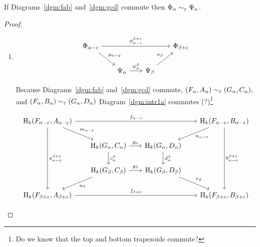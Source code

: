 \begin{lemma}
  If Diagrams~\ref{dgm:fab} and~\ref{dgm:gcd} commute then $\Phi_\alpha\sim_\varepsilon \Psi_\alpha$.
\end{lemma}
\begin{proof}

  \begin{enumerate}[label=\Roman*.]
    \item \begin{equation}\label{dgm:intr1}\begin{tikzcd}[column sep=scriptsize]
      \Phi_{\alpha-\e}  \arrow[to=Fb, "\phi_{\alpha-\e}^{\beta+\e}"]
                        \arrow[to=Ga, "\mu_{\alpha-\e}"]
      & & & |[alias=Fb]|
        \Phi_{\beta+\e} \\
      & |[alias=Ga]|
      \Psi_\alpha \arrow[to=Gb, "\psi_\alpha^\beta"]
      & |[alias=Gb]|
        \Psi_\beta \arrow[to=Fb, "\nu_\beta"] &
    \end{tikzcd}\end{equation}

    Because Diagrams~\ref{dgm:fab} and~\ref{dgm:gcd} commute, $(F_\alpha, A_\alpha)\sim_\varepsilon (G_\alpha, C_\alpha),$ and $(F_\alpha, B_\alpha)\sim_\varepsilon (G_\alpha, D_\alpha)$ Diagram~\ref{dgm:intr1a} commutes (?)\footnote{Do we know that the top and bottom trapezoids commute?}

    \begin{equation}\label{dgm:intr1a}\begin{tikzcd}[column sep=scriptsize]
      \hom_k(F_{\alpha-\e}, A_{\alpha-\e})  \arrow[to=Ba, "f_{\alpha-\e}"]
                                            \arrow[to=Ca, "m_{\alpha-\e}"]
                                            \arrow[to=Ab, "a_{\alpha-\e}^{\beta +\e}"]
      & & & |[alias=Ba]|
        \hom_k(F_{\alpha - \e}, B_{\alpha-\e})  \arrow[to=Da, "n_{\alpha -\e}"]
                                                \arrow[to=Bb, "b_{\alpha-\e}^{\beta+\e}"] \\
      & |[alias=Ca]|
      \hom_k(G_\alpha, C_\alpha)  \arrow[to=Da, "g_\alpha"]
                                  \arrow[to=Cb, "c_\alpha^\beta"]
      & |[alias=Da]|
        \hom_k(G_\alpha, D_\alpha)  \arrow[to=Db, "d_\alpha^\beta"] & \\
      & |[alias=Cb]|
      \hom_k(G_\beta, C_\beta)  \arrow[to=Ab, "u_\beta"]
                                \arrow[to=Db, "g_\beta"]
      & |[alias=Db]|
        \hom_k(G_\beta, D_\beta)  \arrow[to=Bb, "v_\beta"] & \\
      |[alias=Ab]|
      \hom_k(F_{\beta +\e}, A_{\beta + \e}) \arrow[to=Bb, "f_{\beta+\e}"]
      & & & |[alias=Bb]|
        \hom_k(F_{\beta+\e}, B_{\beta + \e})
    \end{tikzcd}\end{equation}


\end{enumerate}
\end{proof}
